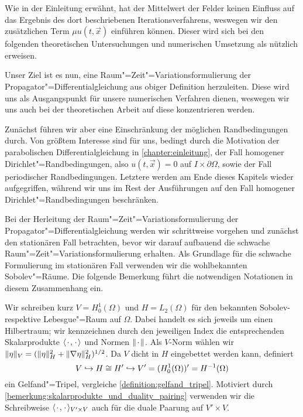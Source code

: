 \documentclass[../main.tex]{subfiles}
\begin{document}
Wie in der Einleitung erwähnt, hat der Mittelwert der Felder keinen Einfluss auf das Ergebnis des dort beschriebenen Iterationsverfahrens, weswegen wir den zusätzlichen Term $\mu u(t, \vec{x})$ einführen können.
Dieser wird sich bei den folgenden theoretischen Untersuchungen und numerischen Umsetzung als nützlich erweisen.

Unser Ziel ist es nun, eine Raum"=Zeit"=Variationsformulierung der Propagator"=Differentialgleichung aus obiger Definition herzuleiten.
Diese wird uns als Ausgangspunkt für unsere numerischen Verfahren dienen, weswegen wir uns auch bei der theoretischen Arbeit auf diese konzentrieren werden.

Zunächst führen wir aber eine Einschränkung der möglichen Randbedingungen durch.
Von größtem Interesse sind für uns, bedingt durch die Motivation der parabolischen Differentialgleichung in \cref{chapter:einleitung}, der Fall homogener Dirichlet"=Randbedingungen, also $u(t, \vec{x}) = 0$ auf $I \times \partial \Omega$, sowie der Fall periodischer Randbedingungen.
Letztere werden am Ende dieses Kapitels wieder aufgegriffen, während wir uns im Rest der Ausführungen auf den Fall homogener Dirichlet"=Randbedingungen beschränken.

Bei der Herleitung der Raum"=Zeit"=Variationsformulierung der Propagator"=Differentialgleichung werden wir schrittweise vorgehen und zunächst den stationären Fall betrachten, bevor wir darauf aufbauend die schwache Raum"=Zeit"=Variationsformulierung erhalten.
Als Grundlage für die schwache Formulierung im stationären Fall verwenden wir die wohlbekannten Sobolev"=Räume.
Die folgende Bemerkung führt die notwendigen Notationen in diesem Zusammenhang ein.

\begin{Bemerkung}
\label{bemerkung:raeume_und_gelfand_tripel}
    Wir schreiben kurz $V = H^{1}_{0}(\Omega)$ und $H = L_{2}(\Omega)$ für den bekannten Sobolev- respektive Lebesgue"=Raum auf $\Omega$.
    Dabei handelt es sich jeweils um einen Hilbertraum; wir kennzeichnen durch den jeweiligen Index die entsprechenden Skalarprodukte $\langle{\mkern2mu\cdot\mkern2mu},{\mkern2mu\cdot\mkern2mu}\rangle_{}$ und Normen $\lVert{\mkern2mu\cdot\mkern2mu}\rVert$.
    Als $V$-Norm wählen wir $\lVert\eta\rVert_{V} = (\lVert\eta\rVert^{2}_{H} + \lVert\nabla \eta\rVert^{2}_{H})^{1/2}$.
    Da $V$ dicht in $H$ eingebettet werden kann, definiert
    \begin{equation}
        V \hookrightarrow H \cong H' \hookrightarrow V' = (H^{1}_{0}(\Omega))' = H^{-1}(\Omega)
    \end{equation}
    ein Gelfand"=Tripel, vergleiche \cref{definition:gelfand_tripel}.
    Motiviert durch \cref{bemerkung:skalarprodukte_und_duality_pairing} verwenden wir die Schreibweise $\langle{\mkern2mu\cdot\mkern2mu},{\mkern2mu\cdot\mkern2mu}\rangle_{V' \times V}$ auch für die duale Paarung auf $V' \times V$.
\end{Bemerkung}
\end{document}
